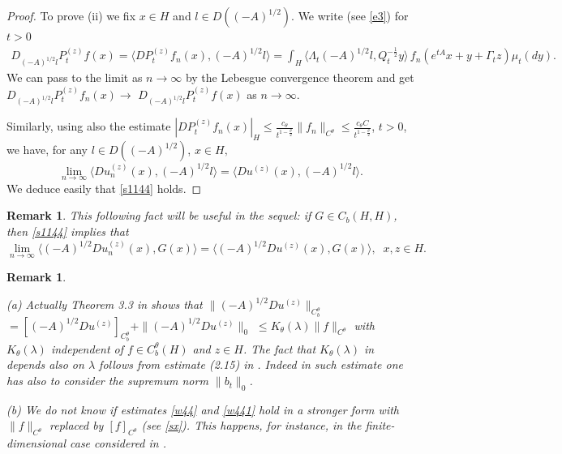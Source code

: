 \documentclass[preprint]{imsart}
\newtheorem{remark}[theorem]{Remark}
\begin{document}
\begin{proof}
  To prove (ii) 
  we fix $x \in H$ and $l \in D((-A)^{1/2})$. We  write (see \eqref{e3}) for $t>0$
  \begin{gather*}
 D_{ (-A)^{1/2} l} {P_{t}^{(z)}}f(x) = \langle D P_t^{(z)} f_n(x),  (-A)^{1/2} l
 \rangle  = \int_H \langle
  \Lambda_t (-A)^{1/2} l ,Q_t^{-\frac12} y\rangle \, f_n (e^{tA}x+y+ \Gamma_t z) \mu_t(dy).
\end{gather*}
  We can  pass to the limit as $n \to \infty$   by the Lebesgue convergence theorem and get $D_{ (-A)^{1/2} l} {P_{t}^{(z)}}f_n(x) \to $  $D_{ (-A)^{1/2} l} {P_{t}^{(z)}}f(x)$ as $n \to \infty$. 
  
  
  Similarly,  using also the estimate $ |D {{P_{t}^{(z)}}} f_n(x)|_H \le  \frac{c_{\theta}}{t^{1 - \frac{\theta}{2}}}\|f_n\|_{C^{\theta}}  \le 
  \frac{c_{\theta} C}{t^{1 - \frac{\theta}{2}}} $, $t>0$,
     we have, for any $l \in D( (-A)^{1/2} )$, $x \in H, $
$$
 \lim_{n \to \infty} \langle Du^{(z)}_n(x) ,(-A)^{1/2} l \rangle    = 
  \langle Du^{(z)} (x) ,(-A)^{1/2} l \rangle.  
$$
We deduce easily that \eqref{s1144} holds. 
 \end{proof}  
 
 
 
\begin{remark} \label{fi12} {\em  This following fact will be useful in the sequel:
 if $G \in C_b(H,H)$, then \eqref{s1144} implies that
\begin{equation}
\label{w12} 
\lim_{n \to \infty} \langle (-A)^{1/2} Du^{(z)}_n(x) , G(x)\rangle =
  \langle (-A)^{1/2}   Du^{(z)}(x) , G(x)\rangle,\;\; x,z \in H. 
\end{equation}
}
\end{remark} 
 

\begin{remark} \label{estendi}{\em  (a) Actually Theorem 3.3 in \cite{D2}  shows    that 
  $\| (-A)^{1/2} Du^{(z)} \|_{C_b^{\theta}} $ $= [ (-A)^{1/2} Du^{(z)} ]_{C_b^{\theta}} 
 + \| (-A)^{1/2} Du^{(z)} \|_{0}  $ $\le K_{\theta}(\lambda) \|f\|_{C^{\theta}}$ with $K_{\theta}(\lambda) $ independent of $f\in C^{\theta}_b(H)$ and $z \in H$.
  The fact that  $K_{\theta}(\lambda)$ in \cite{D2} depends also on $\lambda$ follows from  estimate  (2.15) in \cite{D2}. Indeed in such estimate one has also to consider the supremum norm 
   $\| b_t\|_0$.  

  
 (b) We do not know if estimates \eqref{w44} and \eqref{w441} hold in  a stronger form  with $\| f\|_{C^{\theta}}$ replaced by $[ f ]_{C^{\theta}}$ (see \eqref{sx}). This happens, for instance, in the finite-dimensional case   considered in \cite{DL}.
}
\end{remark}
\end{document}
